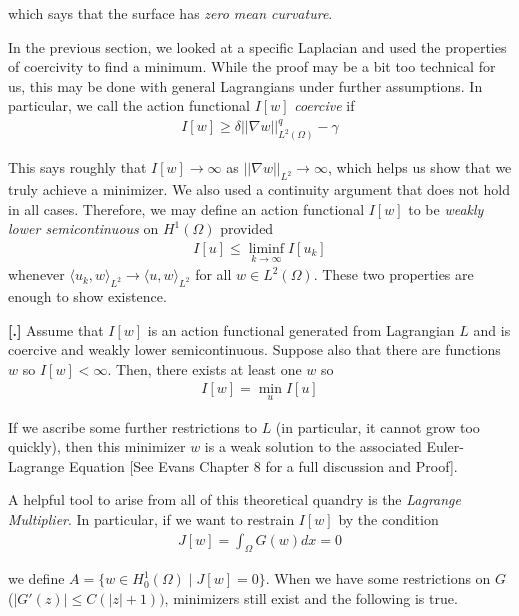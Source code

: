 \documentclass{article}
\newcommand{ \norm }[1]{{ || {#1}||}}
\newcounter{result}[section]
\newenvironment{res}[1][]{\refstepcounter{result}\par\medskip
	\noindent \textbf{[\thesection.\theresult] #1} \rmfamily}{\medskip}
\begin{document}
	which says that the surface has \textit{zero mean curvature}. 
	
	\vspace{1cm}
	
	In the previous section, we looked at a specific Laplacian and used the properties of coercivity to find a minimum. While the proof may be a bit too technical for us, this may be done with general Lagrangians under further assumptions. In particular, we call the action functional $I[w]$ \textit{coercive} if 
	\begin{align*}
		I[w] \geq \delta \norm{\nabla w}_{L^{2}(\Omega)}^{q} - \gamma
	\end{align*}
	
	This says roughly that $I[w] \to \infty$ as $\norm{\nabla w}_{L^{2}} \to \infty$, which helps us show that we truly achieve a minimizer. We also used a continuity argument that does not hold in all cases. Therefore, we may define an action functional $I[w]$ to be \textit{weakly lower semicontinuous} on $H^{1}(\Omega)$ provided 
	\begin{align*}
		I[u] \leq \liminf_{k \to \infty} I[u_k]
	\end{align*}
	whenever $\langle u_{k},w\rangle_{L^{2}} \to \langle u,w\rangle_{L^{2}}$ for all $w \in L^{2}(\Omega)$. These two properties are enough to show existence.
	
	\begin{res}
		Assume that $I[w]$ is an action functional generated from Lagrangian $L$ and is coercive and weakly lower semicontinuous. Suppose also that there are functions $w$ so $I[w] < \infty$. Then, there exists at least one $w$ so 
		\begin{align*}
			I[w] = \min_{u} I[u]
		\end{align*} 
	\end{res}
	
	If we ascribe some further restrictions to $L$ (in particular, it cannot grow too quickly), then this minimizer $w$ is a weak solution to the associated Euler-Lagrange Equation [See Evans Chapter 8 for a full discussion and Proof]. 
	
	A helpful tool to arise from all of this theoretical quandry is the \textit{Lagrange Multiplier}. In particular, if we want to restrain $I[w]$ by the condition 
	\begin{align*}
		J[w] = \int_{\Omega} G(w) dx = 0
	\end{align*}
	
	we define $A = \{w \in H^{1}_{0}(\Omega) \mid J[w] = 0\}$. When we have some restrictions on $G$ ($|G'(z)| \leq C(|z|+1))$, minimizers still exist and the following is true. 
	
\end{document}

